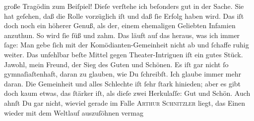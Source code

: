                große Tragödin zum Beiſpiel!
               Dieſe verſtehe ich beſonders gut in der Sache. Sie hat geſehen, daß die Rolle vorzüglich iſt und daß{ }ſie Erfolg haben wird. Das iſt doch \strikeout{\textcolor{gray}{w}} noch ein höherer Genuß, als der,  einem ehemaligen Geliebten Infamien anzuthun. So
               wird{ }ſie ſüß und zahm. Das läuft auf das heraus,
               was ich immer{ }ſage: Man gebe{ }ſich mit der Komödianten-Gemeinheit {\pb}nicht ab und{ }ſchaffe ruhig weiter. Das unfehlbar
               beſte Mittel gegen  Theater-Intriguen iſt ein
               gutes Stück. Jawohl, mein Freund, der Sieg des Guten und Schönen. Es iſt gar nicht{ }ſo
               gymnaſiaſtenhaft, daran zu glauben, wie Du{ }ſchreibſt. Ich glaube immer mehr daran.
               Die Gemeinheit und alles Schlechte iſt{ }ſehr{ }ſtark hinieden; aber es gibt doch kaum
               etwas, das{ }ſtärker iſt, als dieſe zwei Herkulaſſe: {\pb}Gut und Schön. Auch ahnſt Du gar nicht, wieviel gerade im Falle \textsc{Arthur Schnitzler} liegt, das Einen wieder mit dem Weltlauf
               auszuſöhnen vermag{\dotssix}\pend
           
